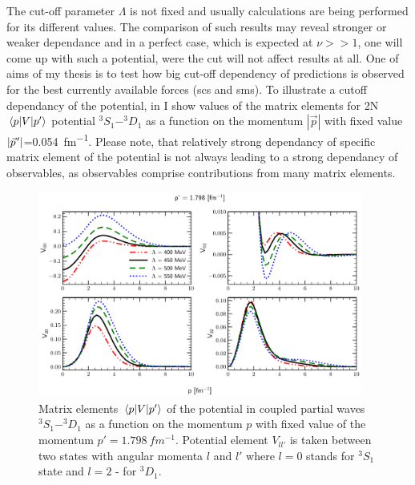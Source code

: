 The cut-off parameter $\Lambda$ is not fixed and usually calculations
are being performed for its different values. The comparison
of such results may reveal stronger or weaker dependance and in a perfect
case, which is expected at $\nu >> 1$, one will come up with such a potential, were the cut will
not affect results at all. One of aims of my thesis is to test how big cut-off dependency
of predictions is
observed for the best currently available forces (\gls{scs} and \gls{sms}). 
To illustrate a cutoff dependancy of the potential, in  
I show values of the matrix elements for 2N $\matrixel{p}{V}{p^\prime}$ potential $^3S_1-^3D_1$
as a function on the momentum $|\vec{p}|$ with fixed value $|\pvec{p}|$=\SI{0.054}{fm^{-1}}.
Please note, that relatively strong dependancy of specific matrix element of the potential
is not always leading to a strong dependancy of observables, as 
observables comprise contributions from many matrix elements.



\begin{figure}[htb]
    \begin{center}
    \includegraphics[width=0.95\textwidth]{PlotData/Deuteron/WAVEFUNC/potential_pp1.798.pdf}
    \end{center}
    \caption{Matrix elements $\matrixel{p}{V}{p^\prime}$ of the potential in
    coupled partial waves $^3S_1 - ^3D_1$ as a function on the momentum $p$ with fixed
    value of the momentum $p'=\SI{1.798}{fm^{-1}}$. Potential element $V_{ll'}$
    is taken between two states with angular momenta  $l$ and $l'$ where $l=0$
    stands  for $^3S_1$ state and $l=2$ - for $^3D_1$. 
    }
    \label{potential_cutoff}
\end{figure}



